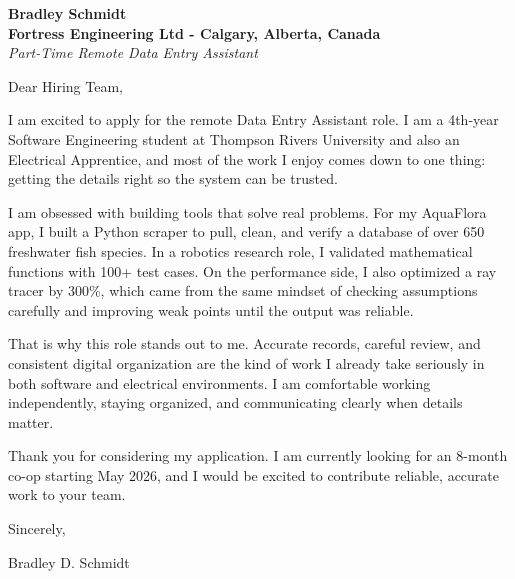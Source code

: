 \documentclass[11pt]{article}
\begin{document}
\textbf{Bradley Schmidt}\\
\vspace{0.5em}
\textbf{Fortress Engineering Ltd - Calgary, Alberta, Canada}\\
\textit{Part-Time Remote Data Entry Assistant}

Dear Hiring Team,

\par

I am excited to apply for the remote Data Entry Assistant role. I am a 4th-year Software Engineering student at Thompson Rivers University and also an Electrical Apprentice, and most of the work I enjoy comes down to one thing: getting the details right so the system can be trusted.

\par

I am obsessed with building tools that solve real problems. For my AquaFlora app, I built a Python scraper to pull, clean, and verify a database of over 650 freshwater fish species. In a robotics research role, I validated mathematical functions with 100+ test cases. On the performance side, I also optimized a ray tracer by 300\%, which came from the same mindset of checking assumptions carefully and improving weak points until the output was reliable.

\par

That is why this role stands out to me. Accurate records, careful review, and consistent digital organization are the kind of work I already take seriously in both software and electrical environments. I am comfortable working independently, staying organized, and communicating clearly when details matter.

\par

Thank you for considering my application. I am currently looking for an 8-month co-op starting May 2026, and I would be excited to contribute reliable, accurate work to your team.

\par

Sincerely,

\par

Bradley D. Schmidt
\end{document}

